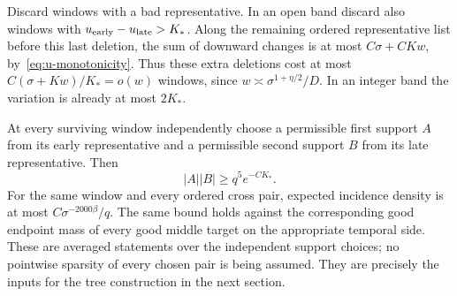 Discard windows with a bad representative.  In an open band discard
also windows with $u_{\rm early}-u_{\rm late}>K_*$.  Along the remaining
ordered representative list before this last deletion, the sum of
downward changes is at most $C\sigma+CKw$, by~\eqref{eq:u-monotonicity}.
Thus these extra deletions cost at most
$C(\sigma+Kw)/K_*=o(w)$ windows, since
$w\asymp\sigma^{1+\eta/2}/D$.  In an integer band the variation is
already at most $2K_*$.

At every surviving window independently choose a permissible first
support $A$ from its early representative and a permissible second
support $B$ from its late representative.  Then
\begin{equation}\label{eq:pivot-support-input}
 |A||B|\ge q^5e^{-CK_*}.
\end{equation}
For the same window and every ordered cross pair, expected incidence
density is at most $C\sigma^{-2000\beta}/q$.  The same bound holds
against the corresponding good endpoint mass of every good middle
target on the appropriate temporal side.  These are averaged statements
over the independent support choices; no pointwise sparsity of every
chosen pair is being assumed.  They are precisely the inputs for the
tree construction in the next section.
